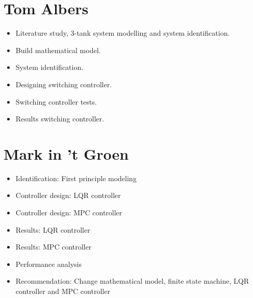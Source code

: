 \section{Tom Albers}
\begin{itemize}
\item Literature study, 3-tank system modelling and system identification.
\item Build mathematical model.
\item System identification.
\item Designing switching controller.
\item Switching controller tests.
\item Results switching controller.

\end{itemize}

\section{Mark in 't Groen}
\begin{itemize}
\item Identification: First principle modeling
\item Controller design: LQR controller
\item Controller design: MPC controller
\item Results: LQR controller
\item Results: MPC controller
\item Performance analysis
\item Recommendation: Change mathematical model, finite state machine, LQR controller and MPC controller
\end{itemize}
